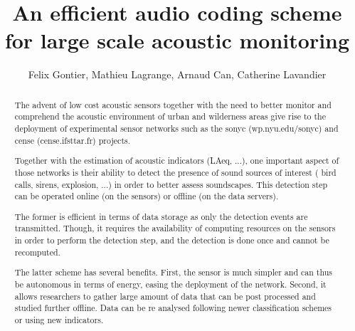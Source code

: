\documentclass[final,3p,times,twocolumn]{elsarticle}
\begin{document}
\begin{frontmatter}




\title{An efficient audio coding scheme for large scale acoustic monitoring}


\author{Felix Gontier, Mathieu Lagrange, Arnaud Can, Catherine Lavandier}

\address{felix.gontier@reseau.eseo.fr\\mathieu.lagrange@cnrs.fr}

\begin{abstract}
The advent of low cost acoustic sensors together with the need to better monitor and comprehend the acoustic environment of urban and wilderness areas give rise to the deployment of experimental sensor networks such as the sonyc (wp.nyu.edu/sonyc) and cense (cense.ifsttar.fr) projects.

Together with the estimation of acoustic indicators (LAeq, ...), one important aspect of those networks is their ability to detect the presence of sound sources of interest ( bird calls, sirens, explosion, ...) in order to better assess soundscapes. This detection step can be operated online (on the sensors) or offline (on the data servers).

The former is efficient in terms of data storage as only the detection events are transmitted. Though, it requires the availability of computing resources on the sensors in order to perform the detection step, and the detection is done once and cannot be recomputed.

The latter scheme has several benefits. First, the sensor is much simpler and can thus be autonomous in terms of energy, easing the deployment of the network. Second, it allows researchers to gather large amount of data that can be post processed and studied further offline. Data can be re analysed following newer classification schemes or using new indicators.


\end{abstract}
\end{frontmatter}
\end{document}
